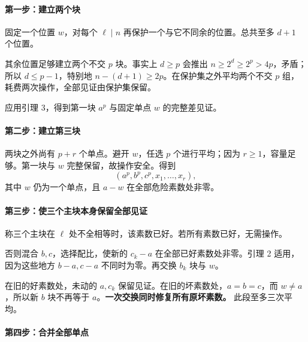 \paragraph*{\texorpdfstring{{第一步：建立两个块}}{第一步：建立两个块}}\label{C8-h52}

{固定一个位置} \(w\){，对每个} \(\ell\mid n\) {再保护一个与它不同余的位置。总共至多} \(d+1\) {个位置。}

{其余位置足够建立两个不交} \(p\) {块。事实上} \(d\ge p\) {会推出} \(n\ge2^d\ge2^p>4p\){，矛盾；所以} \(d\le p-1\){，特别地} \(n-(d+1)\ge2p\){。在保护集之外平均两个不交} \(p\) {组，耗费两次操作，全部见证由保护集保留。}

{应用引理} {3，得到第一块} \(a^p\) {与固定单点} \(w\) {的完整差见证。}

\paragraph*{\texorpdfstring{{第二步：建立第三块}}{第二步：建立第三块}}\label{C8-h53}

{两块之外尚有} \(p+r\) {个单点。避开} \(w\){，任选} \(p\) {个进行平均；因为} \(r\ge1\){，容量足够。第一块与} \(w\) {完整保留，故操作安全。得到} \[
(a^p,b^p,c^p,x_1,\ldots,x_r),
\tag{C8.7}
\] {其中} \(w\) {仍为一个单点，且} \(a-w\) {在全部危险素数处非零。}

\paragraph*{\texorpdfstring{{第三步：使三个主块本身保留全部见证}}{第三步：使三个主块本身保留全部见证}}\label{C8-h54}

{称三个主块在} \(\ell\) {处不全相等时，该素数已好。若所有素数已好，无需操作。}

{否则混合} \(b,c\){，选择配比，使新的} \(c_k-a\) {在全部已好素数处非零。引理} {2} {适用，因为这些地方} \(b-a,c-a\) {不同时为零。再交换} \(b_k\) {块与} \(w\){。}

{在旧的好素数处，未动的} \(a,c_k\) {保留见证。在旧的坏素数处，}\(a=b=c\){，而} \(w\ne a\){，所以新} \(b\) {块不再等于} \(a\){。}\textbf{{一次交换同时修复所有原坏素数。}} {此段至多三次平均。}

\paragraph*{\texorpdfstring{{第四步：合并全部单点}}{第四步：合并全部单点}}\label{C8-h55}

